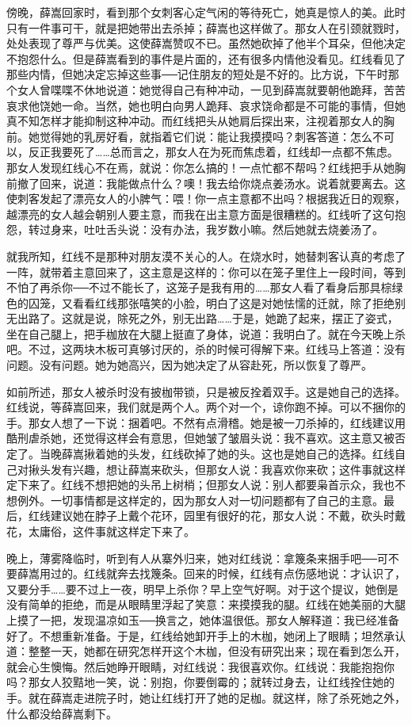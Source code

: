傍晚，薛嵩回家时，看到那个女刺客心定气闲的等待死亡，她真是惊人的美。此时只有一件事可干，就是把她带出去杀掉；薛嵩也这样做了。那女人在引颈就戮时，处处表现了尊严与优美。这使薛嵩赞叹不已。虽然她砍掉了他半个耳朵，但他决定不抱怨什么。但是薛嵩看到的事件是片面的，还有很多内情他没看见。红线看见了那些内情，但她决定忘掉这些事──记住朋友的短处是不好的。比方说，下午时那个女人曾喋喋不休地说道：她觉得自己有种冲动，一见到薛嵩就要朝他跪拜，苦苦哀求他饶她一命。当然，她也明白向男人跪拜、哀求饶命都是不可能的事情，但她真不知怎样才能抑制这种冲动。而红线把头从她肩后探出来，注视着那女人的胸前。她觉得她的乳房好看，就指着它们说：能让我摸摸吗？刺客答道：怎么不可以，反正我要死了……总而言之，那女人在为死而焦虑着，红线却一点都不焦虑。那女人发现红线心不在焉，就说：你怎么搞的！一点忙都不帮吗？红线把手从她胸前撤了回来，说道：我能做点什么？噢！我去给你烧点姜汤水。说着就要离去。这使刺客发起了漂亮女人的小脾气：喂！你一点主意都不出吗？根据我近日的观察，越漂亮的女人越会朝别人要主意，而我在出主意方面是很糟糕的。红线听了这句抱怨，转过身来，吐吐舌头说：没有办法，我岁数小嘛。然后她就去烧姜汤了。 

就我所知，红线不是那种对朋友漠不关心的人。在烧水时，她替刺客认真的考虑了一阵，就带着主意回来了，这主意是这样的：你可以在笼子里住上一段时间，等到不怕了再杀你──不过不能长了，这笼子是我有用的……那女人看了看身后那具棕绿色的囚笼，又看看红线那张嘻笑的小脸，明白了这是对她怯懦的迁就，除了拒绝别无出路了。这就是说，除死之外，别无出路……于是，她跪了起来，摆正了姿式，坐在自己腿上，把手枷放在大腿上挺直了身体，说道：我明白了。就在今天晚上杀吧。不过，这两块木板可真够讨厌的，杀的时候可得解下来。红线马上答道：没有问题。没有问题。她为她高兴，因为她决定了从容赴死，所以恢复了尊严。 

如前所述，那女人被杀时没有披枷带锁，只是被反拴着双手。这是她自己的选择。红线说，等薛嵩回来，我们就是两个人。两个对一个，谅你跑不掉。可以不捆你的手。那女人想了一下说：捆着吧。不然有点滑稽。她是被一刀杀掉的，红线建议用酷刑虐杀她，还觉得这样会有意思，但她皱了皱眉头说：我不喜欢。这主意又被否定了。当晚薛嵩揪着她的头发，红线砍掉了她的头。这也是她自己的选择。红线自己对揪头发有兴趣，想让薛嵩来砍头，但那女人说：我喜欢你来砍；这件事就这样定下来了。红线不想把她的头吊上树梢；但那女人说：别人都要枭首示众，我也不想例外。一切事情都是这样定的，因为那女人对一切问题都有了自己的主意。最后，红线建议她在脖子上戴个花环，园里有很好的花，那女人说：不戴，砍头时戴花，太庸俗，这件事就这样定下来了。 

晚上，薄雾降临时，听到有人从寨外归来，她对红线说：拿篾条来捆手吧──可不要薛嵩用过的。红线就奔去找篾条。回来的时候，红线有点伤感地说：才认识了，又要分手……要不过上一夜，明早上杀你？早上空气好啊。对于这个提议，她倒是没有简单的拒绝，而是从眼睛里浮起了笑意：来摸摸我的腿。红线在她美丽的大腿上摸了一把，发现温凉如玉──换言之，她体温很低。那女人解释道：我已经准备好了。不想重新准备。于是，红线给她卸开手上的木枷，她闭上了眼睛；坦然承认道：整整一天，她都在研究怎样开这个木枷，但没有研究出来；现在看到怎么开，就会心生懊悔。然后她睁开眼睛，对红线说：我很喜欢你。红线说：我能抱抱你吗？那女人狡黠地一笑，说：别抱，你要倒霉的；就转过身去，让红线拴住她的手。就在薛嵩走进院子时，她让红线打开了她的足枷。就这样，除了杀死她之外，什么都没给薛嵩剩下。 

